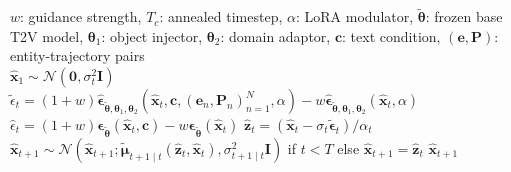 \begin{algorithm} 
\caption{Annealed conditional sampling with classifier-free guidance (CFG)} \label{alg:infer}
\begin{algorithmic}[1]
\Require $w$: guidance strength, $T_c$: annealed timestep, $\alpha$: LoRA modulator, $\tilde{\boldsymbol{\theta}}$: frozen base T2V model, $\boldsymbol{\theta}_1$: object injector, $\boldsymbol{\theta}_2$: domain adaptor, $\mathbf{c}$: text condition, $(\mathbf{e},\mathbf{P})$: entity-trajectory pairs  \\
$\hat{\mathbf{x}}_1 \sim \mathcal{N}\left(\mathbf{0}, \sigma_{t}^2 \mathbf{I}\right)$
    \State $\tilde{\epsilon}_t=(1+w) \hat{\boldsymbol{\epsilon}}_{\tilde{\boldsymbol\theta},\boldsymbol\theta_1,\boldsymbol\theta_2}\left(\hat{\mathbf{x}}_t, \mathbf{c}, (\mathbf{e}_n,\mathbf{P}_n)_{n=1}^N, \alpha\right)-w \hat{\boldsymbol{\epsilon}}_{\tilde{\boldsymbol\theta},\boldsymbol\theta_1,\boldsymbol\theta_2}\left(\hat{\mathbf{x}}_t, \alpha\right)$
\Else{}
    \State $\hat{\epsilon}_t=(1+w) \boldsymbol{\epsilon}_{\tilde{\boldsymbol\theta}}\left(\hat{\mathbf{x}}_t, \mathbf{c}\right)-w\boldsymbol{\epsilon}_{\tilde{\boldsymbol\theta}}\left(\hat{\mathbf{x}}_t\right)$ 
\EndIf 
\State $\hat{\boldsymbol{z}}_t = \left(\hat{\mathbf{x}}_t-\sigma_t \tilde{\boldsymbol{\epsilon}}_t\right) / \alpha_t$
\State $\hat{\mathbf{x}}_{t+1} \sim \mathcal{N}\left(\hat{\mathbf{x}}_{t+1} ; \tilde{\boldsymbol{\mu}}_{t+1 \mid t}\left(\hat{\boldsymbol{z}}_t, \hat{\mathbf{x}}_t\right), \sigma_{t+1 \mid t}^2 \mathbf{I}\right)$ if $t < T$ else $\hat{\mathbf{x}}_{t+1}=\hat{\boldsymbol{z}}_t$
\EndFor
\State \Return $\hat{\mathbf{x}}_{t+1}$
\end{algorithmic}
\end{algorithm}

\vspace{-1.5em}
